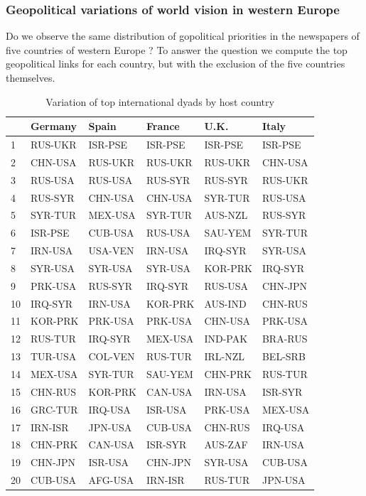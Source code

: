 \documentclass[
]{article}
\begin{document}
\hypertarget{geopolitical-variations-of-world-vision-in-western-europe}{%
\subsubsection{Geopolitical variations of world vision in western
Europe}\label{geopolitical-variations-of-world-vision-in-western-europe}}

Do we observe the same distribution of gopolitical priorities in the
newspapers of five countries of western Europe ? To answer the question
we compute the top geopolitical links for each country, but with the
exclusion of the five countries themselves.

\begin{table}

\caption{\label{tab:unnamed-chunk-4}Variation of top international dyads by host country}
\centering
\begin{tabular}[t]{l|l|l|l|l|l}
\hline
  & Germany & Spain & France & U.K. & Italy\\
\hline
1 & RUS-UKR & ISR-PSE & ISR-PSE & ISR-PSE & ISR-PSE\\
\hline
2 & CHN-USA & RUS-UKR & RUS-UKR & RUS-UKR & CHN-USA\\
\hline
3 & RUS-USA & RUS-USA & RUS-SYR & RUS-SYR & RUS-UKR\\
\hline
4 & RUS-SYR & CHN-USA & CHN-USA & SYR-TUR & RUS-USA\\
\hline
5 & SYR-TUR & MEX-USA & SYR-TUR & AUS-NZL & RUS-SYR\\
\hline
6 & ISR-PSE & CUB-USA & RUS-USA & SAU-YEM & SYR-TUR\\
\hline
7 & IRN-USA & USA-VEN & IRN-USA & IRQ-SYR & SYR-USA\\
\hline
8 & SYR-USA & SYR-USA & SYR-USA & KOR-PRK & IRQ-SYR\\
\hline
9 & PRK-USA & RUS-SYR & IRQ-SYR & RUS-USA & CHN-JPN\\
\hline
10 & IRQ-SYR & IRN-USA & KOR-PRK & AUS-IND & CHN-RUS\\
\hline
11 & KOR-PRK & PRK-USA & PRK-USA & CHN-USA & PRK-USA\\
\hline
12 & RUS-TUR & IRQ-SYR & MEX-USA & IND-PAK & BRA-RUS\\
\hline
13 & TUR-USA & COL-VEN & RUS-TUR & IRL-NZL & BEL-SRB\\
\hline
14 & MEX-USA & SYR-TUR & SAU-YEM & CHN-PRK & RUS-TUR\\
\hline
15 & CHN-RUS & KOR-PRK & CAN-USA & IRN-USA & ISR-SYR\\
\hline
16 & GRC-TUR & IRQ-USA & ISR-USA & PRK-USA & MEX-USA\\
\hline
17 & IRN-ISR & JPN-USA & CUB-USA & CHN-RUS & IRQ-USA\\
\hline
18 & CHN-PRK & CAN-USA & ISR-SYR & AUS-ZAF & IRN-USA\\
\hline
19 & CHN-JPN & ISR-USA & CHN-JPN & SYR-USA & CUB-USA\\
\hline
20 & CUB-USA & AFG-USA & IRN-ISR & RUS-TUR & JPN-USA\\
\hline
\end{tabular}
\end{table}
\end{document}
